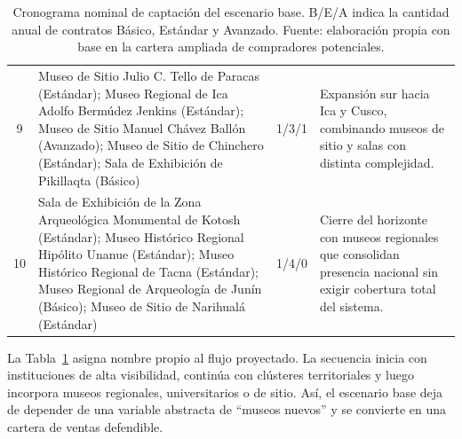 \begin{table}[h!]
{\begin{tabular}{c >{\raggedright\arraybackslash}p{8.4cm} c >{\raggedright\arraybackslash}p{4.6cm}}
		9 & Museo de Sitio Julio C. Tello de Paracas (Estándar); Museo Regional de Ica Adolfo Bermúdez Jenkins (Estándar); Museo de Sitio Manuel Chávez Ballón (Avanzado); Museo de Sitio de Chinchero (Estándar); Sala de Exhibición de Pikillaqta (Básico) & 1/3/1 & Expansión sur hacia Ica y Cusco, combinando museos de sitio y salas con distinta complejidad. \\
		10 & Sala de Exhibición de la Zona Arqueológica Monumental de Kotosh (Estándar); Museo Histórico Regional Hipólito Unanue (Estándar); Museo Histórico Regional de Tacna (Estándar); Museo Regional de Arqueología de Junín (Básico); Museo de Sitio de Narihualá (Estándar) & 1/4/0 & Cierre del horizonte con museos regionales que consolidan presencia nacional sin exigir cobertura total del sistema. \\
		\hline
	\end{tabular}%
	}
	\caption[Cronograma nominal de captación del escenario base]{Cronograma nominal de captación del escenario base. B/E/A indica la cantidad anual de contratos Básico, Estándar y Avanzado. Fuente: elaboración propia con base en la cartera ampliada de compradores potenciales.}
	\label{tab:cronograma-nominal-museiq}
\end{table}

La Tabla~\ref{tab:cronograma-nominal-museiq} asigna nombre propio al flujo proyectado. La secuencia inicia con instituciones de alta visibilidad, continúa con clústeres territoriales y luego incorpora museos regionales, universitarios o de sitio. Así, el escenario base deja de depender de una variable abstracta de ``museos nuevos'' y se convierte en una cartera de ventas defendible.

